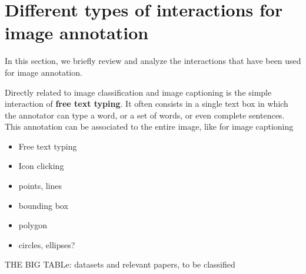 \section{Different types of interactions for image annotation}%
\label{sec:annotation-types}
In this section, we briefly review and analyze the interactions that have been used for image annotation.

Directly related to image classification and image captioning
is the simple interaction of \textbf{free text typing}.
It often consists in a single text box in which the annotator can type a word,
or a set of words, or even complete sentences.
This annotation can be associated to the entire image, like for image captioning

\begin{itemize}
	\item Free text typing
	\item Icon clicking
	\item points, lines
	\item bounding box
	\item polygon
	\item circles, ellipses?
\end{itemize}

THE BIG TABLe: datasets and relevant papers, to be classified
